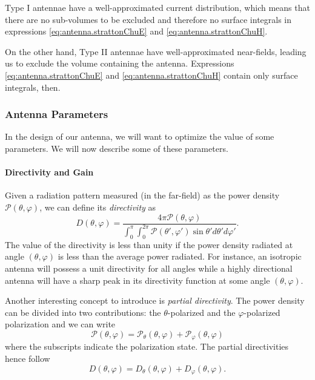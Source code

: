 Type I antennae have a well-approximated current distribution, which means that there are no
sub-volumes to be excluded and therefore no surface integrals in expressions 
\eqref{eq:antenna.strattonChuE} and \eqref{eq:antenna.strattonChuH}. 

On the other hand, Type II antennae have well-approximated near-fields, leading
us to exclude the volume containing the antenna. Expressions \eqref{eq:antenna.strattonChuE}
and \eqref{eq:antenna.strattonChuH} contain only surface integrals, then. 

\subsubsection{Antenna Parameters}
In the design of our antenna, we will want to optimize the value
of some parameters. We will now describe some of these parameters.

\paragraph[Directivity and Gain]{Directivity and Gain \cite[\S 1.16]{ELL2003}}
Given a radiation pattern measured (in the far-field) as the power density 
$\mathcal{P}(\theta,\varphi)$, we can define its \textit{directivity}
as
  \begin{equation}
   D(\theta,\varphi) = \frac{4\pi\mathcal{P}(\theta,\varphi)}
			{\int_0^\pi\int_0^{2\pi}\mathcal{P}(\theta',\varphi')\sin\theta'd\theta'd\varphi'}.
  \end{equation}
The value of the directivity is less than unity if the power density radiated at angle $(\theta,\varphi)$
is less than the average power radiated. For instance, an isotropic antenna will possess a unit directivity
for all angles while a highly directional antenna will have a sharp peak  in its directivity function 
at some angle $(\theta,\varphi)$.

Another interesting concept to introduce is \textit{partial directivity}. 
The power density can be divided into two contributions: the $\theta$-polarized
and the $\varphi$-polarized polarization and we can write
  \begin{equation}
    \mathcal{P}(\theta,\varphi) = \mathcal{P}_\theta(\theta,\varphi)+\mathcal{P}_\varphi(\theta,\varphi)
  \end{equation}
where the subscripts indicate the polarization state. The partial 
directivities hence follow
  \begin{equation}
   D(\theta,\varphi) = D_\theta(\theta,\varphi)+D_\varphi(\theta,\varphi).
  \end{equation}

